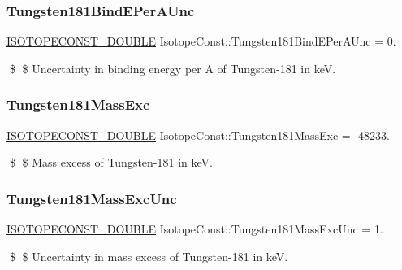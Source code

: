 \subsubsection{\texorpdfstring{Tungsten181\+Bind\+E\+Per\+A\+Unc}{Tungsten181BindEPerAUnc}}
{\footnotesize\ttfamily \mbox{\hyperlink{group___isotope_const-_macros_ga8f45a7272ce02c0b4c65c44636ed719a}{I\+S\+O\+T\+O\+P\+E\+C\+O\+N\+S\+T\+\_\+\+D\+O\+U\+B\+LE}} Isotope\+Const\+::\+Tungsten181\+Bind\+E\+Per\+A\+Unc = 0.}

\$ \$ Uncertainty in binding energy per A of Tungsten-\/181 in keV. \mbox{\label{group___isotope_const-_tungsten-_w181_ga73d26323492a00d357004a4c07753d1d}} 
\subsubsection{\texorpdfstring{Tungsten181\+Mass\+Exc}{Tungsten181MassExc}}
{\footnotesize\ttfamily \mbox{\hyperlink{group___isotope_const-_macros_ga8f45a7272ce02c0b4c65c44636ed719a}{I\+S\+O\+T\+O\+P\+E\+C\+O\+N\+S\+T\+\_\+\+D\+O\+U\+B\+LE}} Isotope\+Const\+::\+Tungsten181\+Mass\+Exc = -\/48233.}

\$ \$ Mass excess of Tungsten-\/181 in keV. \mbox{\label{group___isotope_const-_tungsten-_w181_gaf5abdbb5cbf874055d42e4a01fb1358c}} 
\subsubsection{\texorpdfstring{Tungsten181\+Mass\+Exc\+Unc}{Tungsten181MassExcUnc}}
{\footnotesize\ttfamily \mbox{\hyperlink{group___isotope_const-_macros_ga8f45a7272ce02c0b4c65c44636ed719a}{I\+S\+O\+T\+O\+P\+E\+C\+O\+N\+S\+T\+\_\+\+D\+O\+U\+B\+LE}} Isotope\+Const\+::\+Tungsten181\+Mass\+Exc\+Unc = 1.}

\$ \$ Uncertainty in mass excess of Tungsten-\/181 in keV. \mbox{\label{group___isotope_const-_tungsten-_w181_gad2ac333d3e57d102f51a3dc997877292}} 
